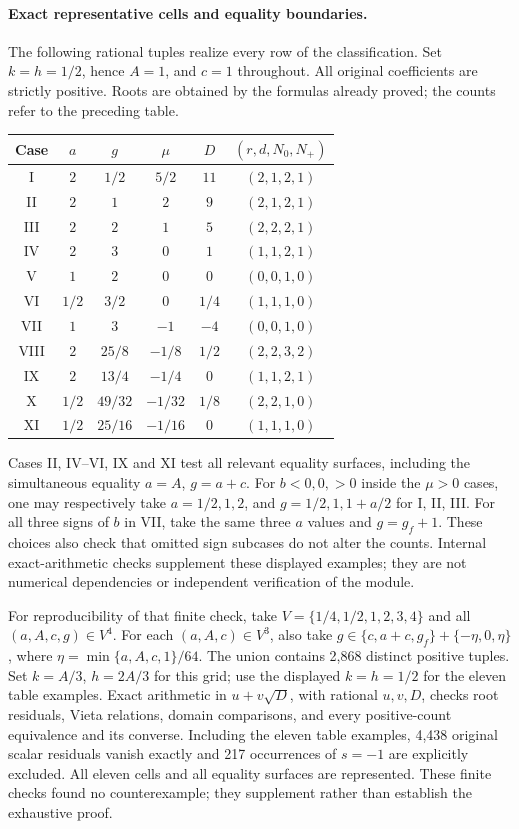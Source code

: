 \documentclass[11pt]{article}
\theoremstyle{definition}
\theoremstyle{remark}
\begin{document}
\paragraph{Exact representative cells and equality boundaries.}
The following rational tuples realize every row of the classification.
Set $k=h=1/2$, hence $A=1$, and $c=1$ throughout.
All original coefficients are strictly positive. Roots are obtained
by the formulas already proved; the counts refer to the preceding table.
\begin{center}
\small
\renewcommand{\arraystretch}{1.12}
\begin{tabular}{@{}c c c c c c@{}}
\toprule
Case & $a$ & $g$ & $\mu$ & $D$ & $(r,d,N_0,N_+)$\\
\midrule
I & $2$ & $1/2$ & $5/2$ & $11$ & $(2,1,2,1)$\\
II & $2$ & $1$ & $2$ & $9$ & $(2,1,2,1)$\\
III & $2$ & $2$ & $1$ & $5$ & $(2,2,2,1)$\\
IV & $2$ & $3$ & $0$ & $1$ & $(1,1,2,1)$\\
V & $1$ & $2$ & $0$ & $0$ & $(0,0,1,0)$\\
VI & $1/2$ & $3/2$ & $0$ & $1/4$ & $(1,1,1,0)$\\
VII & $1$ & $3$ & $-1$ & $-4$ & $(0,0,1,0)$\\
VIII & $2$ & $25/8$ & $-1/8$ & $1/2$ & $(2,2,3,2)$\\
IX & $2$ & $13/4$ & $-1/4$ & $0$ & $(1,1,2,1)$\\
X & $1/2$ & $49/32$ & $-1/32$ & $1/8$ & $(2,2,1,0)$\\
XI & $1/2$ & $25/16$ & $-1/16$ & $0$ & $(1,1,1,0)$\\
\bottomrule
\end{tabular}
\end{center}
Cases II, IV--VI, IX and XI test all relevant equality surfaces,
including the simultaneous equality $a=A$, $g=a+c$.
For $b<0,0,>0$ inside the $\mu>0$ cases, one may respectively
take $a=1/2,1,2$, and $g=1/2,1,1+a/2$ for I, II, III.
For all three signs of $b$ in VII, take the same three $a$ values
and $g=g_f+1$. These choices also check that omitted sign subcases
do not alter the counts. Internal exact-arithmetic checks supplement
these displayed examples; they are not numerical dependencies or
independent verification of the module.

For reproducibility of that finite check, take
$V=\{1/4,1/2,1,2,3,4\}$ and all $(a,A,c,g)\in V^4$.
For each $(a,A,c)\in V^3$, also take
$g\in\{c,a+c,g_f\}+\{-\eta,0,\eta\}$, where
$\eta=\min\{a,A,c,1\}/64$. The union contains 2,868 distinct
positive tuples. Set $k=A/3$, $h=2A/3$ for this grid; use the
displayed $k=h=1/2$ for the eleven table examples. Exact arithmetic
in $u+v\sqrt D$, with rational $u,v,D$, checks root residuals,
Vieta relations, domain comparisons, and every positive-count
equivalence and its converse. Including the eleven table examples,
4,438 original scalar residuals vanish exactly and 217 occurrences
of $s=-1$ are explicitly excluded. All eleven cells and all equality
surfaces are represented. These finite checks found no counterexample;
they supplement rather than establish the exhaustive proof.
\end{document}
